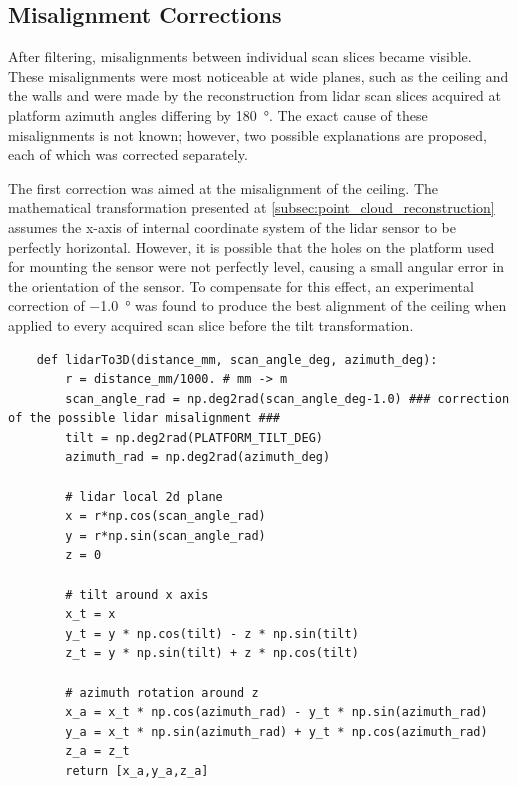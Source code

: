 \subsection{Misalignment Corrections}
After filtering, misalignments between individual scan slices became visible. 
These misalignments were most noticeable at wide planes, such as the ceiling and the walls and were made by the reconstruction from \gls{lidar} scan slices acquired at platform azimuth angles differing by \SI{180}{\degree}.
The exact cause of these misalignments is not known; however, two possible explanations are proposed, each of which was corrected separately.

The first correction was aimed at the misalignment of the ceiling.
The mathematical transformation presented at \cref{subsec:point_cloud_reconstruction} assumes the x-axis of internal coordinate system of the \gls{lidar} sensor to be perfectly horizontal.
However, it is possible that the holes on the platform used for mounting the sensor were not perfectly level, causing a small angular error in the orientation of the sensor.
To compensate for this effect, an experimental correction of \SI{-1,0}{\degree} was found to produce the best alignment of the ceiling when applied to every acquired scan slice before the tilt transformation.

\begin{listing}[H]
\caption{Code snippet with the compensation for assumed \gls{lidar} misalignment}
\begin{verbatim}
    def lidarTo3D(distance_mm, scan_angle_deg, azimuth_deg):
        r = distance_mm/1000. # mm -> m
        scan_angle_rad = np.deg2rad(scan_angle_deg-1.0) ### correction of the possible lidar misalignment ###
        tilt = np.deg2rad(PLATFORM_TILT_DEG)
        azimuth_rad = np.deg2rad(azimuth_deg)

        # lidar local 2d plane
        x = r*np.cos(scan_angle_rad)
        y = r*np.sin(scan_angle_rad)
        z = 0 

        # tilt around x axis
        x_t = x
        y_t = y * np.cos(tilt) - z * np.sin(tilt)
        z_t = y * np.sin(tilt) + z * np.cos(tilt)

        # azimuth rotation around z
        x_a = x_t * np.cos(azimuth_rad) - y_t * np.sin(azimuth_rad)
        y_a = x_t * np.sin(azimuth_rad) + y_t * np.cos(azimuth_rad)
        z_a = z_t
        return [x_a,y_a,z_a]
\end{verbatim}
\end{listing}

